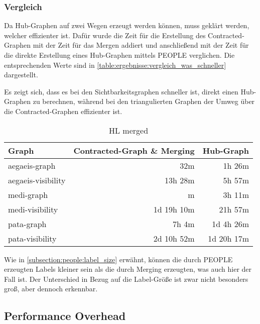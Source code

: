 \subsubsection{Vergleich}


Da Hub-Graphen auf zwei Wegen erzeugt werden können, muss geklärt werden, welcher effizienter ist.
Dafür wurde die Zeit für die Erstellung des Contracted-Graphen mit der Zeit für das Mergen addiert und anschließend mit der Zeit für die direkte Erstellung eines Hub-Graphen mittels PEOPLE verglichen.
Die entsprechenden Werte sind in \autoref{table:ergebnisse:vergleich_was_schneller} dargestellt.

Es zeigt sich, dass es bei den Sichtbarkeitsgraphen schneller ist, direkt einen Hub-Graphen zu berechnen, während bei den triangulierten Graphen der Umweg über die Contracted-Graphen effizienter ist.

\begin{table}[h!]
  \centering
  \begin{tabular}{ %
      l %
      r
      r
    }
    \toprule
    {Graph}            & {Contracted-Graph \& Merging} & {Hub-Graph}          \\
    \midrule
    aegaeis-graph      & \B 32m                        & 1h 26m               \\
    aegaeis-visibility & 13h 28m                       & \B 5h 57m            \\
    medi-graph         & \B 57 m                       & 3h 11m               \\
    medi-visibility    & 1d 19h 10m                    & \B 21h 57m           \\
    pata-graph         & \B 7h \phantom{0} 4m          & 1d \phantom{0}4h 26m \\
    pata-visibility    & 2d 10h 52m                    & \B 1d 20h 17m        \\  \bottomrule
  \end{tabular}
  \caption{HL  merged}
  \label{table:ergebnisse:vergleich_was_schneller}
\end{table}

Wie in \autoref{subsection:people:label_size} erwähnt, können die durch PEOPLE erzeugten Labels kleiner sein als die durch Merging erzeugten, was auch hier der Fall ist.
Der Unterschied in Bezug auf die Label-Größe ist zwar nicht besonders groß, aber dennoch erkennbar.

\subsection{Performance Overhead}

